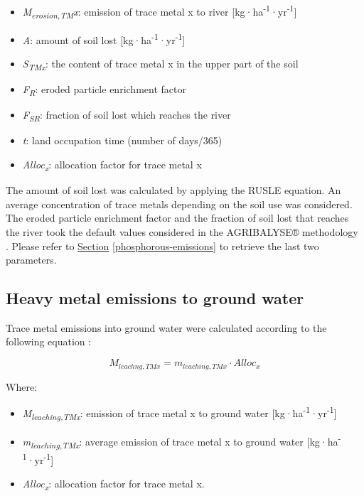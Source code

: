 \documentclass[openany]{book}
\begin{document}
\begin{itemize}
\item
  \emph{M\textsubscript{erosion,TM}x}: emission of trace metal x to river {[}kg·ha\textsuperscript{-1}·yr\textsuperscript{-1}{]}
\item
  \emph{A}: amount of soil lost {[}kg·ha\textsuperscript{-1}·yr\textsuperscript{-1}{]}
\item
  \emph{S\textsubscript{TMx}}: the content of trace metal x in the upper part of the soil
\item
  \emph{F\textsubscript{R}}: eroded particle enrichment factor
\item
  \emph{F\textsubscript{SR}}: fraction of soil lost which reaches the river
\item
  \emph{t}: land occupation time (number of days/365)
\item
  \emph{Alloc\textsubscript{x}}: allocation factor for trace metal x
\end{itemize}

The amount of soil lost was calculated by applying the RUSLE equation. An average concentration of trace metals depending on the soil use was considered. The eroded particle enrichment factor and the fraction of soil lost that reaches the river took the default values considered in the AGRIBALYSE® methodology \citep{Koch2015}. Please refer to \protect\hyperlink{phosphorous-emissions}{Section} \ref{phosphorous-emissions} to retrieve the last two parameters.

\hypertarget{heavy-metal-emissions-to-ground-water}{%
\subsection{Heavy metal emissions to ground water}\label{heavy-metal-emissions-to-ground-water}}

Trace metal emissions into ground water were calculated according to the following equation \citep{Koch2015}:

\[M_{leachng,TMx} = m_{leaching,TMx} \cdot Alloc_x\]

Where:

\begin{itemize}
\item
  \emph{M\textsubscript{leaching,TMx}}: emission of trace metal x to ground water {[}kg·ha\textsuperscript{-1}·yr\textsuperscript{-1}{]}
\item
  \emph{m\textsubscript{leaching,TMx}}: average emission of trace metal x to ground water {[}kg·ha\textsuperscript{-1}·yr\textsuperscript{-1}{]}
\item
  \emph{Alloc\textsubscript{x}}: allocation factor for trace metal x.
\end{itemize}


\end{document}
